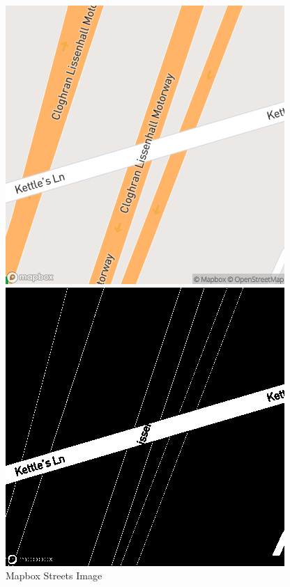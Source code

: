 \begin{figure}[htbp]
    \centering
    \begin{minipage}{0.45\textwidth}
        \centering
        \includegraphics[width=\textwidth]{images/streets.png}
        \caption*{Mapbox Streets Image}
    \end{minipage}
    \hfill
    \begin{minipage}{0.45\textwidth}
        \centering
        \includegraphics[width=\textwidth]{images/old_mask.png}

\end{minipage}
\end{figure}
